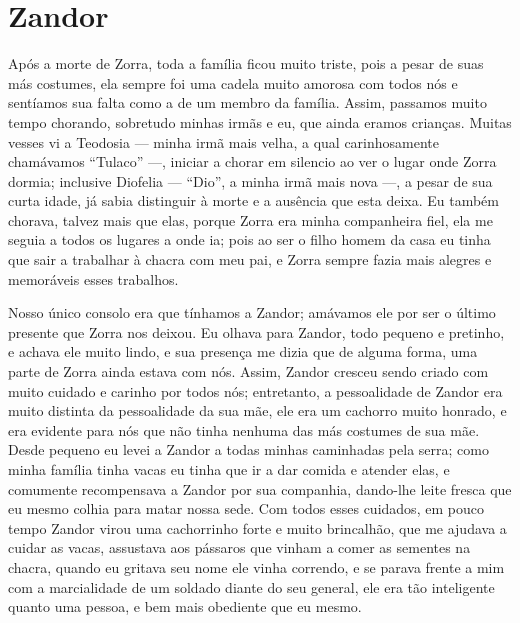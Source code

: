 \cleardoublepage
\newpage
{}
\chapter{Zandor}

Após a morte de Zorra, toda a família ficou muito triste, pois a pesar de suas más costumes, ela sempre foi uma cadela muito amorosa com todos nós e sentíamos sua falta como a de um membro da família. 
Assim, passamos muito tempo chorando, sobretudo minhas irmãs e eu, que ainda eramos crianças. 
Muitas vesses vi a Teodosia ---  minha irmã mais velha, a qual carinhosamente chamávamos ``Tulaco'' ---, iniciar a chorar em silencio ao ver o lugar onde Zorra dormia; inclusive Diofelia  --- ``Dio'', a minha irmã mais nova ---, a pesar de sua curta idade, já sabia distinguir à morte e a ausência que esta deixa. Eu também chorava, talvez mais que elas, porque Zorra era minha companheira fiel, ela me seguia a todos os lugares a onde ia; pois ao ser o filho homem da casa eu tinha que sair a trabalhar à chacra com meu pai, e Zorra sempre fazia mais alegres e memoráveis esses trabalhos.

Nosso único consolo era que tínhamos a Zandor; amávamos ele por ser o último presente que Zorra nos deixou.
Eu olhava para Zandor, todo pequeno e pretinho, e achava ele muito lindo, e sua presença me dizia que de alguma forma, uma parte de Zorra ainda estava com nós. 
Assim, Zandor cresceu sendo criado com muito cuidado e carinho por todos nós;
entretanto, a pessoalidade de Zandor era muito distinta da pessoalidade da sua mãe, ele era um cachorro muito honrado, e era evidente para nós que não tinha nenhuma das más costumes de sua mãe. 
Desde pequeno eu levei a Zandor a todas minhas caminhadas pela serra; como minha família tinha vacas eu tinha que ir a dar comida e atender elas, e comumente recompensava a Zandor por sua companhia, dando-lhe leite fresca que eu mesmo colhia para matar nossa sede. 
Com todos esses cuidados, em pouco tempo Zandor virou uma cachorrinho forte e muito brincalhão,
que me ajudava a cuidar as vacas, assustava aos pássaros que vinham a comer as sementes na chacra, quando eu gritava seu nome ele vinha correndo, e se parava frente a mim com a marcialidade de um soldado diante do seu general, ele era tão inteligente quanto uma pessoa, e bem mais obediente que eu mesmo.

